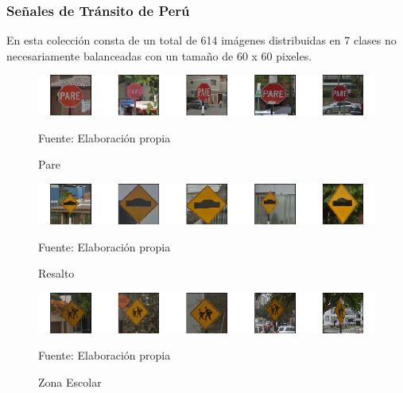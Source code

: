 		\subsubsection{Señales de Tránsito de Perú}

			En esta colección consta de un total de 614 imágenes distribuidas en 7 clases no necesariamente balanceadas con un tamaño de 60 x 60 pixeles.

			\begin{figure}[H]
				\begin{center}
				\includegraphics[width=1\textwidth]{images/desarrollo/imagenes/peru/1__(1).png}
				\end{center}
				\begin{center}
				\caption{\small{Pare}}
				\vskip -0.25cm
				{\small{Fuente: Elaboración propia}}
				\end{center}
				\vspace{-1.5em}
			\end{figure}

			\begin{figure}[H]
				\begin{center}
				\includegraphics[width=1\textwidth]{images/desarrollo/imagenes/peru/1__(2).png}
				\end{center}
				\begin{center}
				\caption{\small{Resalto}}
				\vskip -0.25cm
				{\small{Fuente: Elaboración propia}}
				\end{center}
				\vspace{-1.5em}
			\end{figure}

			\begin{figure}[H]
				\begin{center}
				\includegraphics[width=1\textwidth]{images/desarrollo/imagenes/peru/1__(3).png}
				\end{center}
				\begin{center}
				\caption{\small{Zona Escolar}}
				\vskip -0.25cm
				{\small{Fuente: Elaboración propia}}
				\end{center}
				\vspace{-1.5em}
			\end{figure}

